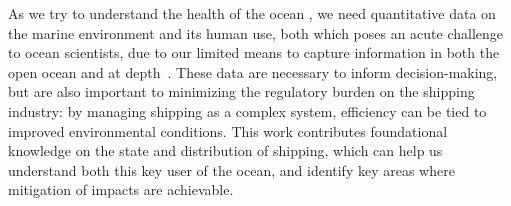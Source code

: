 


As we try to understand the health of the ocean \citep{Halpern2012}, we need quantitative data on the marine environment and its human use, both which poses an acute challenge to ocean scientists, due to our limited means to capture information in both the open ocean and at depth~\citep{Wright1997}. These data are necessary to inform decision-making, but are also important to minimizing the regulatory burden on the shipping industry: by managing shipping as a complex system, efficiency can be tied to improved environmental conditions. This work contributes foundational knowledge on the state and distribution of shipping, which can help us understand both this key user of the ocean, and identify key areas where mitigation of impacts are achievable.






